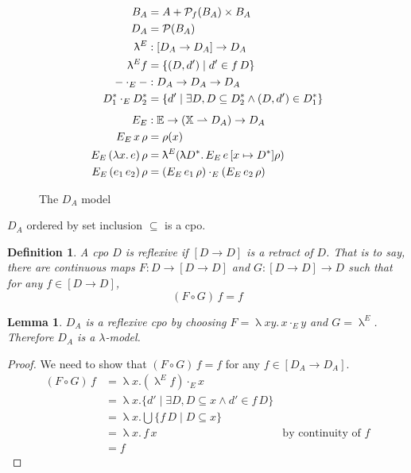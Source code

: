 \documentclass{tufte-handout}
\newcommand{\LAM}[1]{\lambda #1.\,}
\newcommand{\pto}[0]{\rightharpoonup}
\newcommand{\VAR}[0]{\mathbb{X}}
\newtheorem{lemma}[theorem]{Lemma}
\newtheorem{definition}{Definition}%
\begin{document}
\begin{figure}[tbp]
\begin{align*}
  B_A &= A + \mathcal{P}_f(B_A) \times B_A \\
  D_A &= \mathcal{P}(B_A) \\
   \uplambda^E &: [D_A \to D_A] \to D_A \\
   \uplambda^E f &= \{ (D,d') \mid d' \in f\, D \} \\
   - \cdot_E - &: D_A \to D_A \to D_A \\
   D^{*}_1 \cdot_E D^{*}_2 &= \{ d' \mid \exists D, D \subseteq D^{*}_2 \land (D,d') \in D^{*}_1 \} \\[1ex]
\EE &: \mathbb{E} \to (\VAR\pto D_A) \to D_A\\
\ESEM{ x }\rho &= \rho(x) \\
\ESEM{ (\LAM{x} e) }\rho &= \uplambda^E (\uplambda D^{*}.\, \ESEM{e}[x\mapsto D^{*}]\rho)\\
\ESEM{ (e_1\,e_2) }\rho &= (\ESEM{ e_1 }\rho) \cdot_E (\ESEM{ e_2 }\rho) 
\end{align*}
\caption{The $D_A$ model}
\label{fig:d-a}
\end{figure}


$D_A$ ordered by set inclusion $\subseteq$ is a cpo.


\begin{definition}
  A cpo $D$ is \emph{reflexive} if $[D \to D]$ is a retract of $D$.
  That is to say, there are continuous maps $F:D \to [D \to D]$ and
  $G: [D \to D] \to D $ such that for any $f \in [D \to D]$,
  \[
    (F \circ G)\, f = f
  \]
\end{definition}


\begin{lemma}
  $D_A$ is a reflexive cpo by choosing $F = \uplambda x y.\, x \cdot_E
  y$ and $G= \uplambda^E$. Therefore $D_A$ is a
  $\lambda$-model.
\end{lemma}
\begin{proof}
  We need to show that $(F \circ G)\,f = f$
  for any $f \in [D_A \to D_A]$.
  \begin{align*}
    (F \circ G)\,f &= \uplambda x. (\uplambda^E f) \cdot_E x\\
    &= \uplambda x. \{ d' \mid \exists D, D \subseteq x \land d' \in f\,D \}\\
    &= \uplambda x. \bigcup \{ f\,D \mid D \subseteq x \} \\
    &= \uplambda x.\, f\, x  & \text{by continuity of } f \\
    &= f
  \end{align*}
\end{proof}
\end{document}
